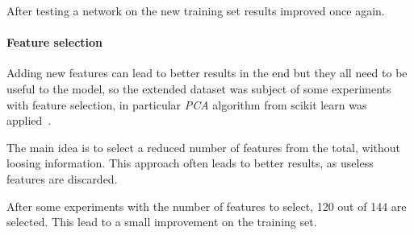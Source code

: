 After testing a network on the new training set 
results improved once again.

\paragraph{Feature selection}
Adding new features can lead to better results 
in the end but they all need to be useful to the model, so 
the extended dataset was subject of some experiments with feature selection, 
in particular \emph{PCA} algorithm from scikit learn was applied~\cite{pca}.

The main idea is to select a reduced number of features from the total, 
without loosing information. This approach often leads to better results, 
as useless features are discarded.

After some experiments with the number of features to select, 120 out of 144
are selected. This lead to a small improvement on the training set.

\newpage
